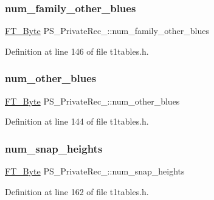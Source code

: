 \subsubsection{\texorpdfstring{num\_family\_other\_blues}{num\_family\_other\_blues}}
{\footnotesize\ttfamily \mbox{\hyperlink{fttypes_8h_a51f26183ca0c9f4af958939648caeccd}{F\+T\+\_\+\+Byte}} P\+S\+\_\+\+Private\+Rec\+\_\+\+::num\+\_\+family\+\_\+other\+\_\+blues}



Definition at line 146 of file t1tables.\+h.

\mbox{\label{struct_p_s___private_rec___a149acdf871b0739f7ab13b1ac8e48a28}} 
\subsubsection{\texorpdfstring{num\_other\_blues}{num\_other\_blues}}
{\footnotesize\ttfamily \mbox{\hyperlink{fttypes_8h_a51f26183ca0c9f4af958939648caeccd}{F\+T\+\_\+\+Byte}} P\+S\+\_\+\+Private\+Rec\+\_\+\+::num\+\_\+other\+\_\+blues}



Definition at line 144 of file t1tables.\+h.

\mbox{\label{struct_p_s___private_rec___a53f7cfd204400a00eb7203b67d6a1b1c}} 
\subsubsection{\texorpdfstring{num\_snap\_heights}{num\_snap\_heights}}
{\footnotesize\ttfamily \mbox{\hyperlink{fttypes_8h_a51f26183ca0c9f4af958939648caeccd}{F\+T\+\_\+\+Byte}} P\+S\+\_\+\+Private\+Rec\+\_\+\+::num\+\_\+snap\+\_\+heights}



Definition at line 162 of file t1tables.\+h.

\mbox{\label{struct_p_s___private_rec___a0bd8b3c1b86b2b3ff66e44cba5297d07}} 
